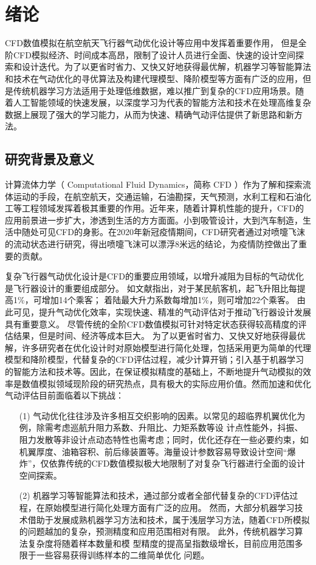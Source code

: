 \chapter{绪论}
CFD数值模拟在航空航天飞行器气动优化设计等应用中发挥着重要作用，
但是全阶CFD模拟经济、时间成本高昂，限制了设计人员进行全面、快速的设计空间探索和设计迭代。为了以更省时省力、又快又好地获得最优解，机器学习等智能算法和技术在气动优化的寻优算法及构建代理模型、降阶模型等方面有广泛的应用，但是传统机器学习方法适用于处理低维数据，难以推广到复杂的CFD应用场景。随着人工智能领域的快速发展，以深度学习为代表的智能方法和技术在处理高维复杂数据上展现了强大的学习能力，从而为快速、精确气动评估提供了新思路和新方法。



\section{研究背景及意义}
计算流体力学（ Computational Fluid Dynamics，简称 CFD ）作为了解和探索流体运动的手段，在航空航天，交通运输，石油勘探，天气预测，水利工程和石油化工等工程领域发挥着极其重要的作用。近年来，随着计算机性能的提升，CFD的应用前景进一步扩大，渗透到生活的方方面面。小到吸管设计，大到汽车制造，生活中随处可见CFD的身影。在2020年新冠疫情期间，CFD研究者通过对喷嚏飞沫的流动状态进行研究，得出喷嚏飞沫可以漂浮8米远的结论，为疫情防控做出了重要的贡献\cite{JAMA-喷嚏}。

复杂飞行器气动优化设计是CFD的重要应用领域，以增升减阻为目标的气动优化是飞行器设计的重要组成部分。
如文献\cite{增升减阻ep}指出，对于某民航客机，起飞升阻比每提高1\%，可增加14个乘客；
着陆最大升力系数每增加1\%，则可增加22个乘客。
由此可见，提升气动优化效率，实现快速、精准的气动评估对于推动飞行器设计发展具有重要意义。
尽管传统的全阶CFD数值模拟可针对特定状态获得较高精度的评估结果，但是时间、经济等成本巨大。
为了以更省时省力、又快又好地获得最优解，许多研究者在优化设计时对原始模型进行简化处理，包括采用更为简单的代理模型\cite{代理模型}和降阶模型\cite{降阶模型}，代替复杂的CFD评估过程，减少计算开销；引入基于机器学习的智能方法和技术等。因此，在保证模拟精度的基础上，不断地提升气动模拟的效率是数值模拟领域现阶段的研究热点，具有极大的实际应用价值。然而加速和优化气动评估目前面临着以下挑战：

\vspace{-0.2cm}
\begin{itemize}
	\item[(1)] 气动优化往往涉及许多相互交织影响的因素。以常见的超临界机翼优化为例，除需考虑巡航升阻力系数、升阻比、力矩系数等设
	计点性能外，抖振、阻力发散等非设计点动态特性也需考虑；同时，优化还存在一些必要约束，如机翼厚度、油箱容积、前后缘装置等。海量设计参数容易导致设计空间“爆炸”，仅依靠传统的CFD数值模拟极大地限制了对复杂飞行器进行全面的设计空间探索。
	\item[(2)] 机器学习等智能算法和技术，通过部分或者全部代替复杂的CFD评估过程，在原始模型进行简化处理方面有广泛的应用。
	然而，大部分机器学习技术借助于发展成熟机器学习方法和技术，属于浅层学习方法，随着CFD所模拟的问题越加的复杂，预测精度和应用范围相对有限。
	此外，传统机器学习算法复杂度将随着样本数量和模
	型精度的提高呈指数级增长，目前应用范围多限于一些容易获得训练样本的二维简单优化
	问题。

\end{itemize}

